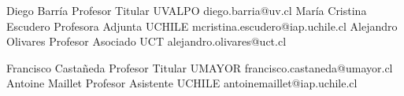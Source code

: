 





\begin{referees}
		{Diego Barría}
		{Profesor Titular}
		{UVALPO}
		{diego.barria@uv.cl}
		{María Cristina Escudero}
		{Profesora Adjunta}
		{UCHILE}
		{mcristina.escudero@iap.uchile.cl}
		{Alejandro Olivares}
		{Profesor Asociado}
		{UCT}
		{alejandro.olivares@uct.cl}
\end{referees}

\begin{referees}
		{Francisco Castañeda}
		{Profesor Titular}
		{UMAYOR}
		{francisco.castaneda@umayor.cl}
		{Antoine Maillet}
		{Profesor Asistente}
		{UCHILE}
		{antoinemaillet@iap.uchile.cl}
\end{referees}
